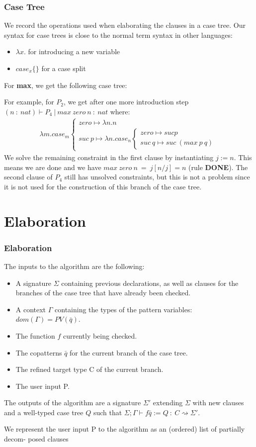 \documentclass[10pt, xelatex, hyperref={pdfpagelabels=false,breaklinks}]{beamer}
\begin{document}
\begin{frame}[fragile]
  \frametitle{Case Tree}
  We record the operations used when elaborating the clauses in a case tree. Our syntax for case trees is close to the normal term syntax in other languages: 
  \begin{itemize}
    \item $λx.$ for introducing a new variable
    \item $case_x\{\}$ for a case split
  \end{itemize}
  For \textbf{max}, we get the following case tree:

  For example, for $P_2$, we get after one more introduction step $(n\ :\ nat) ⊢ P_4\ |\ max\ zero\ n\ :\ nat$ where:
  \begin{align*}
    λm. case_m 
      \begin{cases}
        zero ↦ λ n. n \\
        suc\ p ↦ λ n. case_n
        \begin{cases}
          zero ↦ suc p \\
          suc\ q ↦ suc\ (max\ p\ q)
        \end{cases}       
      \end{cases}       
  \end{align*}
  We solve the remaining constraint in the first clause by instantiating $j := n$. This means we are done and we have $max\ zero\ n\ =\ j[n / j] = n$ (rule \textbf{DONE}). The second clause of $P_4$ still has unsolved constraints, but this is not a problem since it is not used for the construction of this branch of the case tree.
\end{frame}

\section{Elaboration}
\begin{frame}[fragile]
  \frametitle{Elaboration}
  The inputs to the algorithm are the following:
  \begin{itemize}
    \item A signature $\Sigma$ containing previous declarations, as well as clauses for the branches of the case tree that have already been checked.
    \item A context $\Gamma$ containing the types of the pattern variables: $dom(\Gamma)=PV(\bar{q})$.
    \item The function $f$ currently being checked.
    \item The copatterns $\bar{q}$ for the current branch of the case tree.
    \item The refined target type C of the current branch.
    \item The user input P.
  \end{itemize}

  The outputs of the algorithm are a signature $\Sigma'$ extending $\Sigma$ with new clauses and a well-typed case tree $Q$ such that $\Sigma;\Gamma ⊢ f\bar{q} := Q\ :\ C ⇝ \Sigma'$.

  We represent the user input P to the algorithm as an (ordered) list of partially decom- posed clauses
\end{frame}
\end{document}
